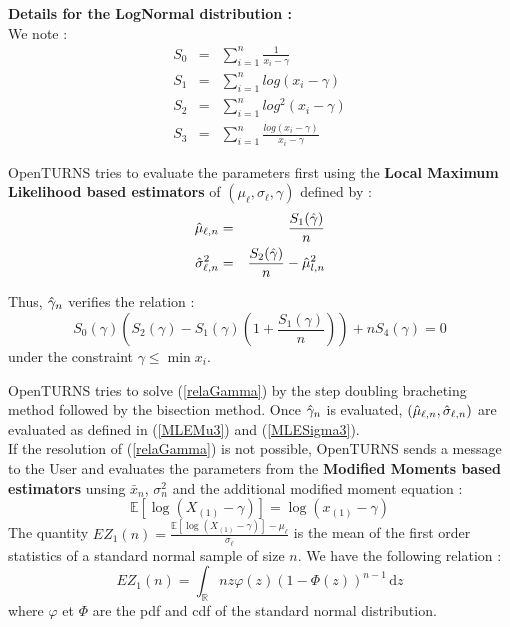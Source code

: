 {  {\bf Details for the LogNormal distribution :} \\

  We note :
  \begin{eqnarray}
    \displaystyle S_0 & = & \sum_{i=1}^n \frac{1}{x_i - \gamma} \nonumber \\
    \displaystyle S_1 & = & \sum_{i=1}^n log(x_i - \gamma)  \nonumber \\
    \displaystyle S_2 &  = & \sum_{i=1}^n log^2(x_i - \gamma)  \nonumber \\
    \displaystyle S_3 & = & \sum_{i=1}^n \frac{log(x_i - \gamma)}{x_i - \gamma} \nonumber
  \end{eqnarray}

  OpenTURNS tries to evaluate the parameters first using  the {\bf Local Maximum Likelihood based estimators} of  $(\mu_\ell, \sigma_\ell, \gamma)$ defined by :
  \begin{eqnarray}
    \displaystyle\Hat{\mu}_{\ell,n} & = & \frac{S_1(\Hat{\gamma})}{n}  \label{MLEMu3} \\
    \displaystyle\Hat{\sigma}_{\ell,n}^2 & = & \frac{S_2(\Hat{\gamma})}{n} - \Hat{\mu}_{l,n}^2 \label{MLESigma3}
  \end{eqnarray}

  Thus, $\Hat{\gamma}_n$ verifies the relation :
  \begin{equation} \label{relaGamma}
    S_0(\gamma)\left(S_2(\gamma)-S_1(\gamma)\left(1+\frac{S_1(\gamma)}{n}\right)\right) + nS_4(\gamma) = 0
  \end{equation}
  under the constraint  $\gamma \leq \min x_i$.

  OpenTURNS tries to solve (\ref{relaGamma})  by the step doubling bracheting method followed by the bisection method. Once $\Hat{\gamma}_n$ is evaluated, $(\Hat{\mu}_{\ell, n}, \Hat{\sigma}_{\ell, n})$ are evaluated as defined in (\ref{MLEMu3}) and (\ref{MLESigma3}).\\

  If the resolution of (\ref{relaGamma}) is not possible, OpenTURNS sends a message to the User and evaluates the parameters from the {\bf Modified Moments based estimators} unsing $ \bar{x}_n$, $\sigma_n^2$ and the additional modified moment equation :
  \begin{equation}\label{momentmod}
    \mathbb{E}[ \log(X_{(1)}-\gamma)] = \log (x_{(1)}-\gamma)
  \end{equation}
  The quantity $\displaystyle EZ_{1}(n) = \frac{\mathbb{E}[ \log(X_{(1)}-\gamma)]-\mu_\ell}{\sigma_\ell}$ is the mean of the first order statistics of a standard normal sample of size $n$. We have the following relation :
  \begin{equation}
    EZ_{1}(n) = \int_\mathbb{R} nz\varphi(z)(1-\Phi(z))^{n-1}\, \mathrm{d}z
  \end{equation}
  where $\varphi$ et $\Phi$ are the pdf and cdf of the standard normal distribution. \\

}
